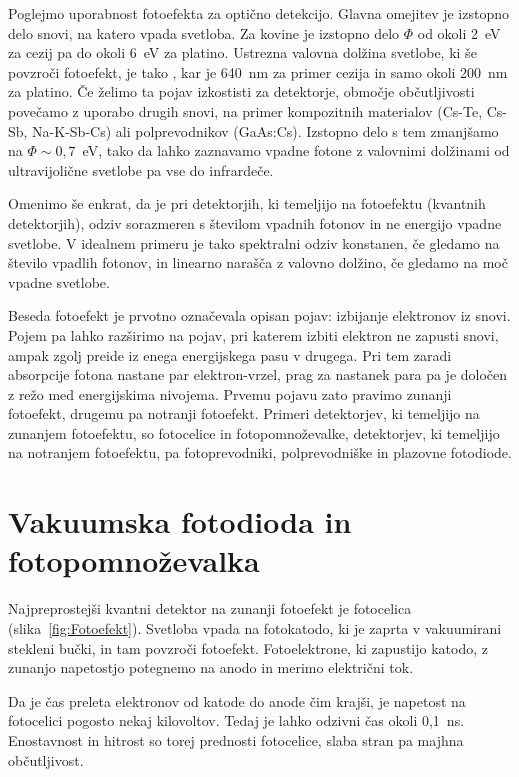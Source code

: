 Poglejmo uporabnost fotoefekta za optično detekcijo. Glavna omejitev je 
izstopno delo snovi, na katero vpada svetloba. Za kovine je izstopno delo $\Phi$
od okoli 2~eV za cezij pa do okoli 6~eV za platino. 
Ustrezna valovna dolžina svetlobe, ki še povzroči fotoefekt, je tako 
\beq
\lambda \leq {},
\eeq
kar je 640~nm za primer cezija in samo okoli 200~nm za platino. Če želimo ta pojav
izkostisti za detektorje, območje občutljivosti povečamo z uporabo drugih snovi,
na primer kompozitnih materialov (Cs-Te, Cs-Sb, Na-K-Sb-Cs) ali polprevodnikov (GaAs:Cs).
Izstopno delo s tem zmanjšamo na $\Phi \sim 0,7$~eV, tako da lahko zaznavamo 
vpadne fotone z valovnimi dolžinami od ultravijolične svetlobe pa vse do infrardeče. 

Omenimo še enkrat, da je pri detektorjih, ki temeljijo na fotoefektu
(kvantnih detektorjih), odziv sorazmeren s številom vpadnih fotonov in ne energijo 
vpadne svetlobe. V idealnem primeru je tako spektralni odziv konstanen, 
če gledamo na število vpadlih fotonov, in linearno
narašča z valovno dolžino, če gledamo na moč vpadne svetlobe.

Beseda fotoefekt je prvotno označevala opisan pojav: izbijanje elektronov iz snovi. 
Pojem pa lahko razširimo na pojav, pri katerem izbiti elektron ne zapusti snovi, 
ampak zgolj preide iz enega energijskega pasu v drugega. Pri tem zaradi
absorpcije fotona nastane par elektron-vrzel, prag za nastanek para pa je določen
z režo med energijskima nivojema. Prvemu pojavu zato pravimo zunanji fotoefekt, 
drugemu pa notranji fotoefekt. Primeri detektorjev, ki temeljijo na zunanjem fotoefektu, so 
fotocelice in fotopomnoževalke, detektorjev, ki temeljijo na notranjem fotoefektu, pa
fotoprevodniki, polprevodniške in plazovne fotodiode.


\section{Vakuumska fotodioda in fotopomnoževalka}

Najpreprostejši kvantni detektor na zunanji fotoefekt je fotocelica (slika~\ref{fig:Fotoefekt}). 
Svetloba vpada na fotokatodo, ki je zaprta v vakuumirani stekleni bučki, in tam povzroči
fotoefekt. Fotoelektrone, ki zapustijo katodo, z zunanjo napetostjo potegnemo na anodo 
in merimo električni tok. 

Da je čas preleta
elektronov od katode do anode čim krajši, je napetost na fotocelici pogosto nekaj kilovoltov.
Tedaj je lahko odzivni čas okoli 0,1~ns. Enostavnost in hitrost so torej prednosti fotocelice, slaba
stran pa majhna občutljivost.

